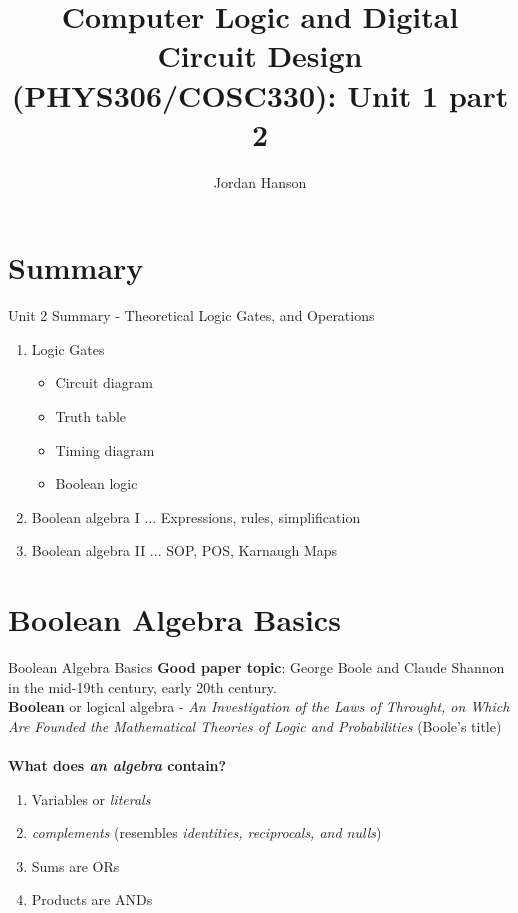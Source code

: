 \documentclass{beamer}
\title{Computer Logic and Digital Circuit Design (PHYS306/COSC330): Unit 1 part 2}
\author{Jordan Hanson}
\institute{Whittier College Department of Physics and Astronomy}
\begin{document}
\maketitle

\section{Summary}

\begin{frame}{Unit 2 Summary - Theoretical Logic Gates, and Operations}
\begin{enumerate}
\item Logic Gates
\begin{itemize}
\item Circuit diagram
\item Truth table
\item Timing diagram
\item Boolean logic
\end{itemize}
\item \alert{Boolean algebra I} ... Expressions, rules, simplification
\item \alert{Boolean algebra II} ... SOP, POS, Karnaugh Maps
\end{enumerate}
\end{frame}

\section{Boolean Algebra Basics}

\begin{frame}{Boolean Algebra Basics}
\textbf{Good paper topic}: George Boole and Claude Shannon in the mid-19th century, early 20th century. \\ \vspace{0.5cm}
\textbf{\alert{Boolean}} or logical algebra - \textit{An Investigation of the Laws of Throught, on Which Are Founded the Mathematical Theories of Logic and Probabilities} (Boole's title) \\ \hrulefill \\
\textbf{What does \textit{an algebra} contain?}
\begin{enumerate}
\item Variables or \textit{literals}
\item \textit{complements} (resembles \textit{identities, reciprocals, and nulls})
\item Sums are ORs
\item Products are ANDs
\end{enumerate}
\end{frame}
\end{document}
